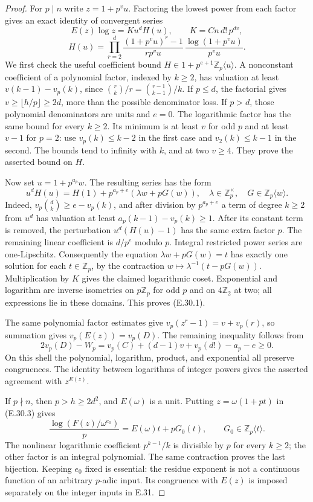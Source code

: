 \begin{proof}
For $p\mid n$ write $z=1+p^v u$.  Factoring the lowest power from
each factor gives an exact identity of convergent series
\[
 E(z)\log z=K u^d H(u),\qquad K=Cn\,d!\,p^{dv},
\]
\[
 H(u)=\prod_{r=2}^d
 \frac{(1+p^vu)^r-1}{rp^vu}\,
 \frac{\log(1+p^vu)}{p^vu}.
 \tag{E.30.4}
\]
We first check the useful coefficient bound
$H\in1+p^{e+1}\mathbb Z_p\langle u\rangle$.  A nonconstant
coefficient of a polynomial factor, indexed by $k\ge2$, has valuation
at least $v(k-1)-v_p(k)$, since
$\binom rk/r=\binom{r-1}{k-1}/k$.  If $p\le d$, the factorial
gives $v\ge\lfloor h/p\rfloor\ge2d$, more than the possible
denominator loss.  If $p>d$, those polynomial denominators are units
and $e=0$.  The logarithmic factor has the same bound for every
$k\ge2$.  Its minimum is at least $v$ for odd $p$ and at least
$v-1$ for $p=2$: use $v_p(k)\le k-2$ in the first case and
$v_2(k)\le k-1$ in the second.  The bounds tend to infinity with
$k$, and at two $v\ge4$.  They prove the asserted bound on $H$.

Now set $u=1+p^{a_p}w$.  The resulting series has the form
\[
 u^dH(u)=H(1)+p^{a_p+e}(\lambda w+pG(w)),
 \quad \lambda\in\mathbb Z_p^\times,
 \quad G\in\mathbb Z_p\langle w\rangle.
 \tag{E.30.5}
\]
Indeed, $v_p\binom dk\ge e-v_p(k)$, and after division by
$p^{a_p+e}$ a term of degree $k\ge2$ from $u^d$ has valuation
at least $a_p(k-1)-v_p(k)\ge1$.  After its constant term is removed,
the perturbation $u^d(H(u)-1)$ has the same extra factor $p$.
The remaining linear coefficient is $d/p^e$ modulo $p$.
Integral restricted power series are one-Lipschitz.  Consequently the
equation $\lambda w+pG(w)=t$ has exactly one solution for each
$t\in\mathbb Z_p$, by the contraction
$w\mapsto\lambda^{-1}(t-pG(w))$.  Multiplication by $K$ gives the
claimed logarithmic coset.  Exponential and logarithm are inverse
isometries on $p\mathbb Z_p$ for odd $p$ and on $4\mathbb Z_2$ at
two; all expressions lie in these domains.  This proves (E.30.1).

The same polynomial factor estimates give
$v_p(z^r-1)=v+v_p(r)$, so summation gives $v_p(E(z))=v_p(D)$.
The remaining inequality follows from
\[
 2v_p(D)-W_p
   =v_p(C)+(d-1)v+v_p(d!)-a_p-e\ge0.
\]
On this shell the polynomial, logarithm, product, and exponential all
preserve congruences.  The identity between logarithms of integer
powers gives the asserted agreement with $z^{E(z)}$.

If $p\nmid n$, then $p>h\ge2d^2$, and $E(\omega)$ is a unit.
Putting $z=\omega(1+pt)$ in (E.30.3) gives
\[
 \frac{\log(F(z)/\omega^{e_0})}{p}
       =E(\omega)t+pG_0(t),\qquad
 G_0\in\mathbb Z_p\langle t\rangle.
\]
The nonlinear logarithmic coefficient $p^{k-1}/k$ is divisible by
$p$ for every $k\ge2$; the other factor is an integral polynomial.
The same contraction proves the last bijection.  Keeping $e_0$
fixed is essential: the residue exponent is not a continuous function
of an arbitrary $p$-adic input.  Its congruence with $E(z)$ is imposed
separately on the integer inputs in E.31.
\end{proof}

